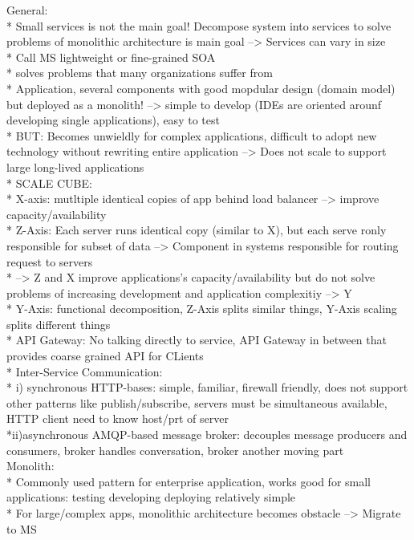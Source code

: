 General: \\
* Small services is not the main goal! Decompose system  into services to solve problems of monolithic architecture is main goal --> Services can vary in size\\
* Call MS lightweight or fine-grained SOA\\
* solves problems that many organizations suffer from\\
* Application, several components with good mopdular design (domain model) but deployed as a monolith! --> simple to develop (IDEs are oriented arounf developing single applications), easy to test\\
* BUT: Becomes  unwieldly for complex applications, difficult to adopt new technology without rewriting entire application --> Does not scale to support large long-lived applications\\
* SCALE CUBE: \\
* X-axis: mutltiple identical copies of app behind load balancer --> improve capacity/availability\\
* Z-Axis: Each server runs identical copy (similar to X), but each serve ronly responsible for subset of data --> Component in systems responsible for routing request to servers\\
* --> Z and X improve applications's capacity/availability but do not solve problems of increasing development and application complexitiy --> Y\\
* Y-Axis: functional decomposition, Z-Axis splits similar things, Y-Axis scaling splits different things\\
* API Gateway: No talking directly to service, API Gateway in between that provides coarse grained API for CLients\\
* Inter-Service Communication:\\
* i) synchronous HTTP-bases: simple, familiar, firewall friendly, does not support other patterns like publish/subscribe, servers must be simultaneous available, HTTP client need to know host/prt of server\\
*ii)asynchronous AMQP-based message broker: decouples message producers and consumers, broker handles conversation, broker another moving part\\


Monolith: \\
* Commonly used pattern for enterprise application, works good for small applications: testing developing deploying relatively simple\\
* For large/complex apps, monolithic architecture becomes  obstacle --> Migrate to MS\\

